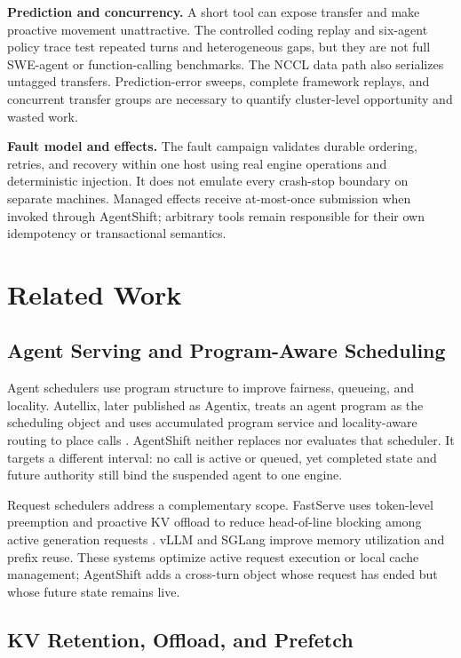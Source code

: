 \textbf{Prediction and concurrency.} A short tool can expose transfer and make proactive movement unattractive. The controlled coding replay and six-agent policy trace test repeated turns and heterogeneous gaps, but they are not full SWE-agent or function-calling benchmarks. The NCCL data path also serializes untagged transfers. Prediction-error sweeps, complete framework replays, and concurrent transfer groups are necessary to quantify cluster-level opportunity and wasted work.

\textbf{Fault model and effects.} The fault campaign validates durable ordering, retries, and recovery within one host using real engine operations and deterministic injection. It does not emulate every crash-stop boundary on separate machines. Managed effects receive at-most-once submission when invoked through AgentShift; arbitrary tools remain responsible for their own idempotency or transactional semantics.

\section{Related Work}\label{related-work}

\subsection{Agent Serving and Program-Aware Scheduling}\label{agent-serving-and-program-aware-scheduling}

Agent schedulers use program structure to improve fairness, queueing, and locality. Autellix, later published as Agentix, treats an agent program as the scheduling object and uses accumulated program service and locality-aware routing to place calls \cite{agentix}. AgentShift neither replaces nor evaluates that scheduler. It targets a different interval: no call is active or queued, yet completed state and future authority still bind the suspended agent to one engine.

Request schedulers address a complementary scope. FastServe uses token-level preemption and proactive KV offload to reduce head-of-line blocking among active generation requests \cite{fastserve}. vLLM \cite{vllm} and SGLang \cite{sglang} improve memory utilization and prefix reuse. These systems optimize active request execution or local cache management; AgentShift adds a cross-turn object whose request has ended but whose future state remains live.

\subsection{KV Retention, Offload, and Prefetch}\label{kv-retention-offload-and-prefetch}

